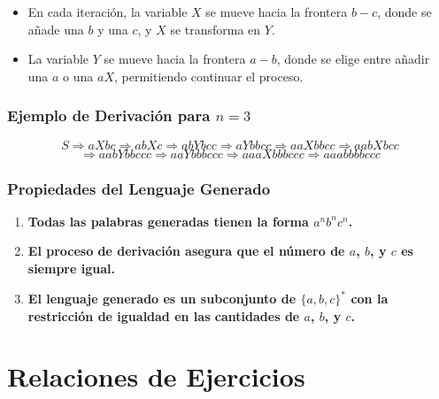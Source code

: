 \documentclass[12pt]{report} %
\providecommand{\tightlist}{%
  \setlength{\itemsep}{0pt}\setlength{\parskip}{0pt}}
\begin{document}
\begin{enumerate}
  \begin{itemize}
  \tightlist
  \item
    En cada iteración, la variable \(X\) se mueve hacia la frontera
    \(b-c\), donde se añade una \(b\) y una \(c\), y \(X\) se transforma
    en \(Y\).\\
  \item
    La variable \(Y\) se mueve hacia la frontera \(a-b\), donde se elige
    entre añadir una \(a\) o una \(aX\), permitiendo continuar el
    proceso.
  \end{itemize}
\end{enumerate}

\hypertarget{ejemplo-de-derivaciuxf3n-para-n-3}{%
\subsection{\texorpdfstring{Ejemplo de Derivación para
\(n = 3\)}{Ejemplo de Derivación para n = 3}}\label{ejemplo-de-derivaciuxf3n-para-n-3}}

\[
S \Rightarrow aXbc \Rightarrow abXc \Rightarrow abYbcc \Rightarrow aYbbcc \Rightarrow aaXbbcc \Rightarrow aabXbcc 
\] \[
\Rightarrow aabYbbccc \Rightarrow aaYbbbccc \Rightarrow aaaXbbbccc \Rightarrow aaabbbbccc
\]

\hypertarget{propiedades-del-lenguaje-generado-1}{%
\subsection{Propiedades del Lenguaje
Generado}\label{propiedades-del-lenguaje-generado-1}}

\begin{enumerate}
\def\labelenumi{\arabic{enumi}.}
\tightlist
\item
  \textbf{Todas las palabras generadas tienen la forma
  \(a^n b^n c^n\).}\\
\item
  \textbf{El proceso de derivación asegura que el número de \(a\),
  \(b\), y \(c\) es siempre igual.}\\
\item
  \textbf{El lenguaje generado es un subconjunto de \(\{a, b, c\}^*\)
  con la restricción de igualdad en las cantidades de \(a\), \(b\), y
  \(c\).}
\end{enumerate}

\chapter{Relaciones de Ejercicios}
\end{document}
